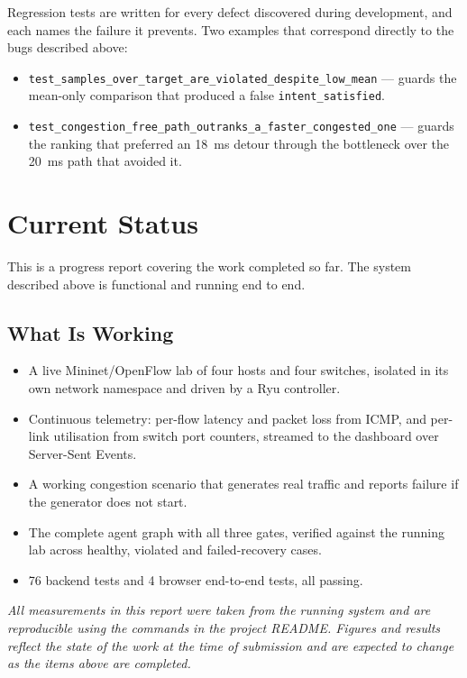 \documentclass[12pt,a4paper]{report}
\begin{document}
Regression tests are written for every defect discovered during development,
and each names the failure it prevents. Two examples that correspond directly to
the bugs described above:

\begin{itemize}
    \item \texttt{test\_samples\_over\_target\_are\_violated\_despite\_low\_mean}
          --- guards the mean-only comparison that produced a false
          \texttt{intent\_satisfied}.
    \item \texttt{test\_congestion\_free\_path\_outranks\_a\_faster\_congested\_one}
          --- guards the ranking that preferred an 18~ms detour through the
          bottleneck over the 20~ms path that avoided it.
\end{itemize}


\section{Current Status}\label{sec:status}

This is a progress report covering the work completed so far. The system described above is functional and running end to end.

\subsection{What Is Working}

\begin{itemize}
    \item A live Mininet/OpenFlow lab of four hosts and four switches, isolated
          in its own network namespace and driven by a Ryu controller.
    \item Continuous telemetry: per-flow latency and packet loss from ICMP, and
          per-link utilisation from switch port counters, streamed to the
          dashboard over Server-Sent Events.
    \item A working congestion scenario that generates real traffic and reports
          failure if the generator does not start.
    \item The complete agent graph with all three gates, verified against the
          running lab across healthy, violated and failed-recovery cases.
    \item 76 backend tests and 4 browser end-to-end tests, all passing.
\end{itemize}



\vfill
\begin{center}
\small\textit{All measurements in this report were taken from the running system
and are reproducible using the commands in the project README. Figures and
results reflect the state of the work at the time of submission and are
expected to change as the items above are completed.}
\end{center}
\end{document}
